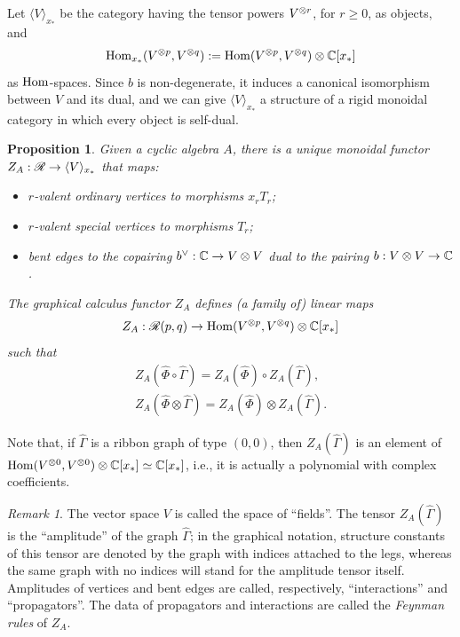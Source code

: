 \documentclass[11pt,twoside]{article}
\theoremstyle{plain}
\newtheorem{proposition}{Proposition}[section]
\theoremstyle{remark}
\newtheorem{remark}{Remark}[section]
\theoremstyle{definition}
\numberwithin{equation}{section} %
\newcommand{\RG}[1][]{{\operad{R}_{#1}}}  %
\begin{document}
Let $\langle V \rangle_{x_*}$ be the category having the tensor powers $V\sp{\otimes r}$,
for $r \geq 0$, as objects, and
\begin{equation*}
  \operatorname{Hom}_{x_*} (V\sp{\otimes p}, V\sp{\otimes q}) := \operatorname{Hom} (V\sp{\otimes p}, V\sp{\otimes q}) \otimes \mathbb{C}[x_*]
\end{equation*}
as $\operatorname{Hom}$-spaces.  Since $b$ is non-degenerate, it induces a canonical
isomorphism between \(V\) and its dual, and we can give $\langle V
\rangle_{x_*}$ a structure of a rigid monoidal category in which every
object is self-dual.
\begin{proposition}
  \label{prop:gc1}
  Given a cyclic algebra $A$, there is a unique monoidal functor $Z_{A}:
  \RG \to \langle V \rangle_{x_*}$ that maps: \begin{itemize} 
  \item $r$-valent ordinary vertices to
    morphisms $x_rT_r$; 
  \item $r$-valent special vertices to morphisms $T_r$;
  \item bent edges to the copairing \(b\spcheck:
    \setC\to V\otimes V\) dual to the pairing $b: V
    \otimes V \to \mathbb{C}$.
  \end{itemize}

  The graphical calculus functor $Z_A$ defines (a family of) linear
  maps
  \begin{equation*}
    Z_{A}: \RG(p,q) \to \Hom(V\tp{p}, V\tp{q})\otimes\setC[x_*]
  \end{equation*}
  such that 
  \begin{gather*}
    Z_{A} (\hat\Phi\circ\hat\Gamma) = Z_{A}(\hat\Phi)\circ Z_{A}(\hat\Gamma),
    \\
    Z_{A}(\hat\Phi\otimes\hat\Gamma) = Z_{A}(\hat\Phi) \otimes Z_{A}(\hat\Gamma).
  \end{gather*}
\end{proposition}
Note that, if $\hat\Gamma$ is a ribbon graph of type $(0,0)$, then
$Z_{A}(\hat\Gamma)$ is an element of $\operatorname{Hom}(V\sp{\otimes 0}, V\sp{\otimes 0})\otimes\mathbb{C}[x_*]\simeq
\mathbb{C}[x_*]$, i.e., it is actually a polynomial with complex coefficients.

\begin{remark}
The vector space $V$ is called the space of ``fields''.  The tensor
$Z_{A}(\hat\Gamma)$ is the ``amplitude'' of the graph $\hat\Gamma$; in the
graphical notation, structure constants of this tensor are denoted by
the graph with indices attached to the legs, whereas the same graph
with no indices will stand for the amplitude tensor itself.
Amplitudes of vertices and bent edges are called, respectively,
``interactions'' and ``propagators''. The data of propagators and
interactions are called the \emph{Feynman rules} of $Z_A$.
\end{remark}
\end{document}
